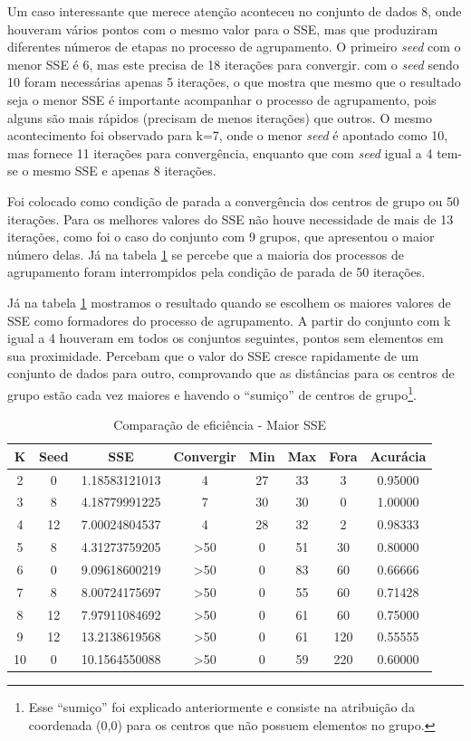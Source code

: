 \documentclass[12pt, a4paper]{article}
\begin{document}
Um caso interessante que merece atenção aconteceu no conjunto de dados 8, onde houveram vários pontos com o mesmo valor para o SSE, mas que produziram diferentes números de etapas no processo de agrupamento. O primeiro \emph{seed} com o menor SSE é 6, mas este precisa de 18 iterações para convergir. com o \emph{seed} sendo 10 foram necessárias apenas 5 iterações, o que mostra que mesmo que o resultado seja o menor SSE é importante acompanhar o processo de agrupamento, pois alguns são mais rápidos (precisam de menos iterações) que outros. O mesmo acontecimento foi observado para k=7, onde o menor \textit{seed} é apontado como 10, mas fornece 11 iterações para convergência, enquanto que com \textit{seed} igual a 4 tem-se o mesmo SSE e apenas 8 iterações.

Foi colocado como condição de parada a convergência dos centros de grupo ou 50 iterações. Para os melhores valores do SSE não houve necessidade de mais de 13 iterações, como foi o caso do conjunto com 9 grupos, que apresentou o maior número delas. Já na tabela \ref{tabPior} se percebe que a maioria dos processos de agrupamento foram interrompidos pela condição de parada de 50 iterações.

Já na tabela \ref{tabPior} mostramos o resultado quando se escolhem os maiores valores de SSE como formadores do processo de agrupamento. A partir do conjunto com k igual a 4  houveram em todos os conjuntos seguintes, pontos sem elementos em sua proximidade. Percebam que o valor do SSE cresce rapidamente de um conjunto de dados para outro, comprovando que as distâncias para os centros de grupo estão cada vez maiores e havendo o ``sumiço'' de centros de grupo\footnote{Esse ``sumiço'' foi explicado anteriormente e consiste na atribuição da coordenada (0,0) para os centros que não possuem elementos no grupo.}.

\begin{table}[!ht]
	\centering
	\caption{Comparação de eficiência - Maior SSE}	
	\label{tabPior}
	\begin{tabular}{|c|c|c|c|c|c|c|c|}
	\hline
	K & Seed & SSE & Convergir & Min & Max & Fora & Acurácia\\
	\hline
	2 & 0 & 1.18583121013 & 4 & 27 & 33 & 3 & 0.95000 \\
	\hline
	3 & 8 & 4.18779991225 & 7 & 30 & 30 & 0 & 1.00000 \\
	\hline
	4 & 12 & 7.00024804537 & 4 & 28 & 32 & 2 & 0.98333\\
	\hline
	5 & 8 & 4.31273759205 & >50 & 0 & 51 & 30 & 0.80000\\
	\hline
	6 & 0 & 9.09618600219 & >50 & 0 & 83 & 60 & 0.66666\\
	\hline
	7 & 8 & 8.00724175697 & >50 & 0 & 55 & 60 & 0.71428\\
	\hline
	8 & 12 & 7.97911084692 & >50 & 0 & 61 & 60 & 0.75000 \\
	\hline
	9 & 12 & 13.2138619568 & >50 & 0 & 61 & 120 & 0.55555\\
	\hline
	10 & 0 & 10.1564550088 & >50 & 0 & 59 & 220 & 0.60000\\
	\hline
	\end{tabular}
\end{table}
\end{document}
